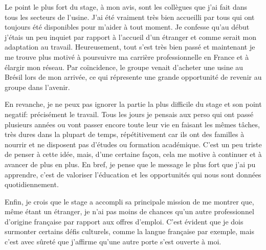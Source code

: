 \documentclass{article}
\begin{document}
\vspace{12pt}

Le point le plus fort du stage, à mon avis, sont les collègues que j'ai fait
dans tous les secteurs de l'usine. J'ai été vraiment très bien accueilli par tous
qui ont toujours été disponibles pour m'aider à tout moment.
Je confesse qu'au début j'étais un peu inquiet par rapport à l'accueil d'un
étranger et comme serait mon adaptation au travail. Heureusement, tout s'est
très bien passé et maintenant je me trouve plus motivé à poursuivre ma carrière
professionnelle en France et à élargir mon réseau. Par coïncidence, le groupe
venait d'acheter une usine au Brésil lors de mon arrivée, ce qui répresente une
grande opportunité de revenir au groupe dans l'avenir.

\vspace{12pt}

En revanche, je ne peux pas ignorer la partie la plus difficile du stage et
son point negatif: précisément le travail. Tous les jours je pensais aux
perso qui ont passé plusieurs années ou vont passer encore toute
leur vie en faisant les mêmes tâches, très dures dans la plupart de temps,
répétitivement car ils ont des familles à nourrir et ne disposent pas d'études
ou formation académique. C'est un peu triste de penser à cette idée, mais, d'une
certaine façon, cela me motive à continuer et à avancer de plus en plus.
En bref, je pense que le message le plus fort que j'ai pu apprendre, c'est de
valoriser l'éducation et les opportunités qui nous sont données quotidiennement.


\vspace{12pt}

Enfin, je crois que le stage a accompli sa principale mission de me montrer
que, même étant un étranger, je n'ai pas moins de chances qu'un autre
professionnel d'origine française par rapport aux offres d'emploi. C'est
évident que je dois surmonter certains défis culturels, comme la langue
française par exemple, mais c'est avec sûreté que j'affirme qu'une autre porte
s'est ouverte à moi. 
\end{document}
